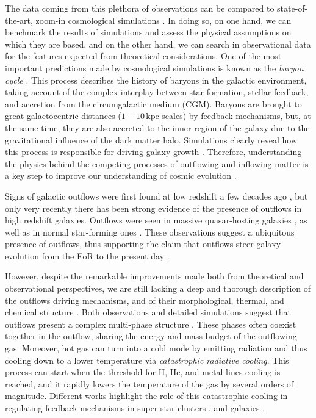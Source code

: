 \documentclass[a4paper, 12pt]{article}
\begin{document}
The data coming from this plethora of observations can be compared to state-of-the-art, zoom-in cosmological simulations \citep{pallottini2017, Hopkins18, pallottini:2019}. In doing so, on one hand, we can benchmark the results of simulations and assess the physical assumptions on which they are based, and on the other hand, we can search in observational data for the features expected from theoretical considerations. One of the most important predictions made by cosmological simulations is known as the \textit{baryon cycle} \citep{peroux2020cosmic}. This process describes the history of baryons in the galactic environment, taking account of the complex interplay between star formation, stellar feedback, and accretion from the circumgalactic medium (CGM). Baryons are brought to great galactocentric distances ($1-10\,\mathrm{kpc}$ scales) by feedback mechanisms, but, at the same time, they are also accreted to the inner region of the galaxy due to the gravitational influence of the dark matter halo. Simulations clearly reveal how this process is responsible for driving galaxy growth \citep{tumlison}. Therefore, understanding the physics behind the competing processes of outflowing and inflowing matter is a key step to improve our understanding of cosmic evolution \citep{2005ARA&A..43..769V}.

Signs of galactic outflows were first found at low redshift a few decades ago \citep{chevalier_clegg:1985, Walter:2002vq}, but only very recently there has been strong evidence of the presence of outflows in high redshift galaxies. Outflows were seen in massive quasar-hosting galaxies \citep{cicone2015}, as well as in normal star-forming ones \citep{gallerani:2018, ginolfi:2019, Sugahara19, herrera2021kiloparsec}. These observations suggest a ubiquitous presence of outflows, thus supporting the claim that outflows steer galaxy evolution from the EoR to the present day \citep{veilleux2020cool}. 

However, despite the remarkable improvements made both from theoretical and observational perspectives, we are still lacking a deep and thorough description of the outflows driving mechanisms, and of their morphological, thermal, and chemical structure \citep{heckman2017galactic}. Both observations and detailed simulations suggest that outflows present a complex multi-phase structure \citep{murray2011, hopkins2014, muratov2015,pandya2021characterizing}. These phases often coexist together in the outflow, sharing the energy and mass budget of the outflowing gas. Moreover, hot gas can turn into a cold mode by emitting radiation and thus cooling down to a lower temperature via \textit{catastrophic radiative cooling}. This process can start when the threshold for H, He, and metal lines cooling is reached, and it rapidly lowers the temperature of the gas by several orders of magnitude. Different works highlight the role of this catastrophic cooling in regulating feedback mechanisms in super-star clusters \citep{Silich:2004,gray2019catastrophic}, and galaxies \citep{Wang:1995, sarkar:2015, Thompson16, Schneider:2018, Gronke&Oh:2020}.
\end{document}
